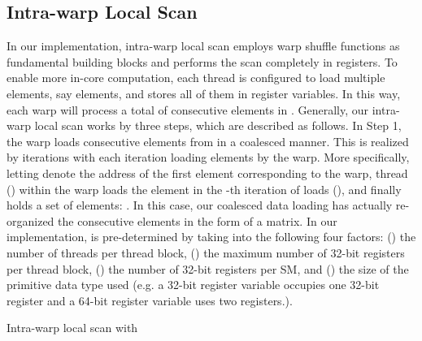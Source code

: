 \documentclass[article]{elsarticle}
\renewcommand{\hl}[1]{#1}
\begin{document}
{\begin{algorithm}[!h]
\begin{algorithmic}[1]
        
        
    \EndFor
\EndProcedure
\end{algorithmic}
\end{algorithm}
\subsection{Intra-warp Local Scan} 
In our implementation, intra-warp local scan employs warp shuffle functions as fundamental building blocks and performs the scan completely in registers. To enable more in-core computation, each thread is configured to load multiple elements, say  elements, and stores all of them in  register variables. In this way, each warp will process a total of  consecutive elements in . Generally, our intra-warp local scan works \hl{by three steps, which are described as follows. In Step 1,} the warp loads  consecutive elements from  in a coalesced manner. This is realized by  iterations with each iteration loading  elements by the warp. More specifically, letting  denote the address of the first element corresponding to the warp, thread  (\mbox{}) within the warp loads the element  in the -th iteration of loads (), and finally holds a set of  elements: . In this case, our coalesced data loading has actually re-organized the  consecutive elements in the form of a  matrix. In our implementation,  is pre-determined by taking into the following four factors: () the number of threads per thread block, () the maximum number of 32-bit registers per thread block, () the number of 32-bit registers per SM, and () the size of the primitive data type used (e.g. a 32-bit register variable occupies one 32-bit register and a 64-bit register variable uses two registers.).
\begin{algorithm}[!h]
\caption{Intra-warp local scan with \mbox{}}
\label{alg:warp_local_scan}
\begin{algorithmic}[1]
\fontsize{8pt}{8.05pt}\selectfont
{}

	\State { = ;}
	\State { = ;}
    \State { = ;}
    \State { = ;}
   	\State { = ;}
    

\end{algorithmic}
\end{algorithm}}
\end{document}
